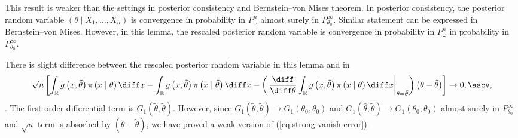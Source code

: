 \begin{rem}
This result is weaker than the settings in posterior consistency and
Bernstein--von Mises theorem. In posterior consistency, the posterior
random variable $\left(\theta\mid X_{1},\ldots,X_{n}\right)$ is convergence
in probability in $P_{\omega}^{n}$ almost surely in $P_{\theta_{0}}^{\infty}$.
Similar statement can be expressed in Bernstein--von Mises. However,
in this lemma, the rescaled posterior random variable is convergence
in probability in $P_{\omega}^{n}$ in probability in $P_{\theta_{0}}^{\infty}$. 
\begin{rem}
There is slight difference between the rescaled posterior random variable
in this lemma and in 
\begin{equation}
\sqrt{n}\left[\int_{\mathbb{R}}g\left(x,\tilde{\theta}\right)\pi\left(x\mid\theta\right)\diff x-\int_{\mathbb{R}}g\left(x,\tilde{\theta}\right)\pi\left(x\mid\tilde{\theta}\right)\diff x-\left(\left.\frac{\diff}{\diff\theta}\int_{\mathbb{R}}g\left(x,\tilde{\theta}\right)\pi\left(x\mid\theta\right)\diff x\right|_{\theta=\tilde{\theta}}\right)\left(\theta-\tilde{\theta}\right)\right]\rightarrow0,\ascv,\label{eq:strong-vanish-error}
\end{equation}
. The first order differential term is $G_{1}\left(\tilde{\theta},\tilde{\theta}\right)$.
However, since $G_{1}\left(\tilde{\theta},\tilde{\theta}\right)\rightarrow G_{1}\left(\theta_{0},\theta_{0}\right)$
and $G_{1}\left(\hat{\theta},\tilde{\theta}\right)\rightarrow G_{1}\left(\theta_{0},\theta_{0}\right)$
almost surely in $P_{\theta_{0}}^{\infty}$and $\sqrt{n}$ term is
absorbed by $\left(\theta-\tilde{\theta}\right)$, we have proved
a weak version of (\ref{eq:strong-vanish-error}). 
\end{rem}
\end{rem}

